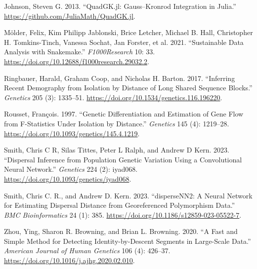 \documentclass[
]{article}
\newlength{\cslhangindent}
\newenvironment{CSLReferences}[2] %
 {\begin{list}{}{%
  \setlength{\itemindent}{0pt}
  \setlength{\leftmargin}{0pt}
  \setlength{\parsep}{0pt}
  \ifodd #1
   \setlength{\leftmargin}{\cslhangindent}
   \setlength{\itemindent}{-1\cslhangindent}
  \fi
  \setlength{\itemsep}{#2\baselineskip}}}
 {\end{list}}
\begin{document}
\begin{CSLReferences}{1}{0}
Johnson, Steven G. 2013. {``{QuadGK.jl}: {G}auss--{K}ronrod Integration
in {J}ulia.''} \url{https://github.com/JuliaMath/QuadGK.jl}.

Mölder, Felix, Kim Philipp Jablonski, Brice Letcher, Michael B. Hall,
Christopher H. Tomkins-Tinch, Vanessa Sochat, Jan Forster, et al. 2021.
{``Sustainable Data Analysis with {Snakemake}.''} \emph{F1000Research}
10: 33. \url{https://doi.org/10.12688/f1000research.29032.2}.

Ringbauer, Harald, Graham Coop, and Nicholas H. Barton. 2017.
{``Inferring {Recent} {Demography} from {Isolation} by {Distance} of
{Long} {Shared} {Sequence} {Blocks}.''} \emph{Genetics} 205 (3):
1335--51. \url{https://doi.org/10.1534/genetics.116.196220}.

Rousset, François. 1997. {``Genetic {Differentiation} and {Estimation}
of {Gene} {Flow} from {F}-{Statistics} {Under} {Isolation} by
{Distance}.''} \emph{Genetics} 145 (4): 1219--28.
\url{https://doi.org/10.1093/genetics/145.4.1219}.

Smith, Chris C R, Silas Tittes, Peter L Ralph, and Andrew D Kern. 2023.
{``Dispersal Inference from Population Genetic Variation Using a
Convolutional Neural Network.''} \emph{Genetics} 224 (2): iyad068.
\url{https://doi.org/10.1093/genetics/iyad068}.

Smith, Chris C. R., and Andrew D. Kern. 2023. {``{disperseNN2}: A Neural
Network for Estimating Dispersal Distance from Georeferenced
Polymorphism Data.''} \emph{BMC Bioinformatics} 24 (1): 385.
\url{https://doi.org/10.1186/s12859-023-05522-7}.

Zhou, Ying, Sharon R. Browning, and Brian L. Browning. 2020. {``A {Fast}
and {Simple} {Method} for {Detecting} {Identity}-by-{Descent} {Segments}
in {Large}-{Scale} {Data}.''} \emph{American Journal of Human Genetics}
106 (4): 426--37. \url{https://doi.org/10.1016/j.ajhg.2020.02.010}.

\end{CSLReferences}
\end{document}
